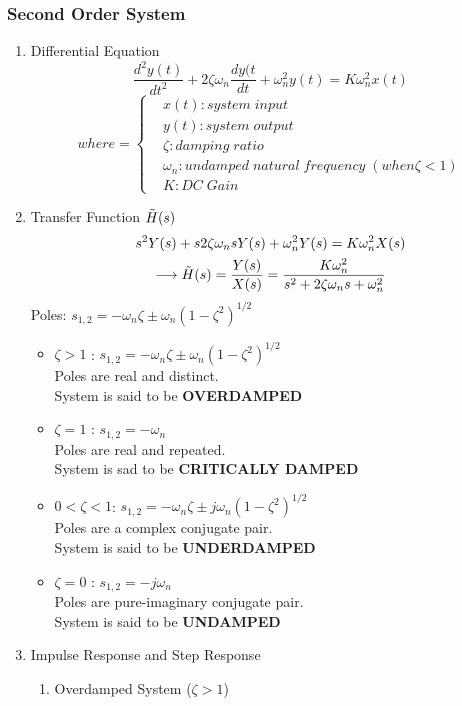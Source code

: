 \subsubsection{Second Order System}
\begin{enumerate}
    \item Differential Equation
    \begin{equation}
        \frac{d^2y(t)}{dt^2}+2\zeta\omega_n\frac{dy(t}{dt}+\omega_n^2y(t) = K\omega_n^2x(t)
    \end{equation}
    \[
    where = 
    \begin{cases}
        & x(t) : system\;input \\
        & y(t) : system\;output \\
        & \zeta : damping\;ratio\\
        & \omega_n : undamped\;natural\;frequency\;(when \zeta < 1) \\
        & K : DC\;Gain
    \end{cases}
    \]
    \item Transfer Function $\Tilde{H}(s)$
    \begin{multline}
        s^2Y(s)+s2\zeta\omega_nsY(s)+\omega_n^2Y(s) = K\omega_n^2X(s) \\
        \longrightarrow \Tilde{H}(s)=\frac{Y(s)}{X(s)} = \frac{K\omega_n^2}{s^2+2\zeta\omega_n s+\omega_n^2}
    \end{multline}
    Poles: $s_{1,2} = -\omega_n\zeta \pm \omega_n(1-\zeta^2)^{1/2}$ 
    \begin{itemize}
        \item $\zeta > 1 $ : $s_{1,2} = -\omega_n\zeta \pm \omega_n(1-\zeta^2)^{1/2}$ \\
        Poles are real and distinct. \\
        System is said to be \textbf{OVERDAMPED}
        \item $\zeta = 1$ : $s_{1,2} =-\omega_n$ \\
        Poles are real and repeated. \\
        System is sad to be \textbf{CRITICALLY DAMPED}
        \item $0<\zeta<1$: $s_{1,2} = -\omega_n\zeta \pm j\omega_n(1-\zeta^2)^{1/2}$ \\
        Poles are a complex conjugate pair. \\
        System is said to be \textbf{UNDERDAMPED}
        \item $\zeta = 0$ : $s_{1,2} =-j\omega_n$ \\
        Poles are pure-imaginary conjugate pair. \\
        System is said to be \textbf{UNDAMPED}
    \end{itemize}
    \item Impulse Response and Step Response
    \begin{enumerate}
        \item Overdamped System ($\zeta > 1$)
    \end{enumerate}
\end{enumerate}